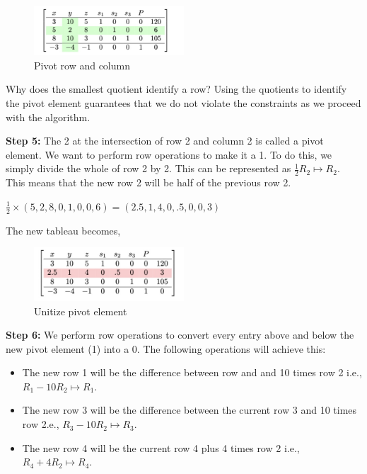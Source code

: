 \documentclass[
  letterpaper,
  DIV=11,
  numbers=noendperiod]{scrreprt}
\providecommand{\tightlist}{%
  \setlength{\itemsep}{0pt}\setlength{\parskip}{0pt}}\usepackage{longtable,booktabs,array}
\begin{document}
\begin{figure}

{\centering \includegraphics[width=0.5\textwidth,height=\textheight]{images/e.jpeg}

}

\caption{Pivot row and column}

\end{figure}

Why does the smallest quotient identify a row? Using the quotients to
identify the pivot element guarantees that we do not violate the
constraints as we proceed with the algorithm.

\textbf{Step 5:} The 2 at the intersection of row 2 and column 2 is
called a pivot element. We want to perform row operations to make it a
1. To do this, we simply divide the whole of row 2 by 2. This can be
represented as \(\frac{1}{2}R_2 \mapsto R_2\). This means that the new
row 2 will be half of the previous row 2.

\(\frac{1}{2}\times(5,2,8,0,1,0,0,6)=(2.5,1,4,0,.5,0,0,3)\)

The new tableau becomes,

\begin{figure}

{\centering \includegraphics[width=0.5\textwidth,height=\textheight]{images/f.jpeg}

}

\caption{Unitize pivot element}

\end{figure}

\textbf{Step 6:} We perform row operations to convert every entry above
and below the new pivot element (1) into a 0. The following operations
will achieve this:

\begin{itemize}
\tightlist
\item
  The new row 1 will be the difference between row and and 10 times row
  2 i.e., \(R_1 - 10R_2\mapsto R_1\).
\item
  The new row 3 will be the difference between the current row 3 and 10
  times row 2.e., \(R_3 - 10R_2\mapsto R_3\).
\item
  The new row 4 will be the current row 4 plus 4 times row 2 i.e.,
  \(R_4 + 4R_2\mapsto R_4\).
\end{itemize}
\end{document}
